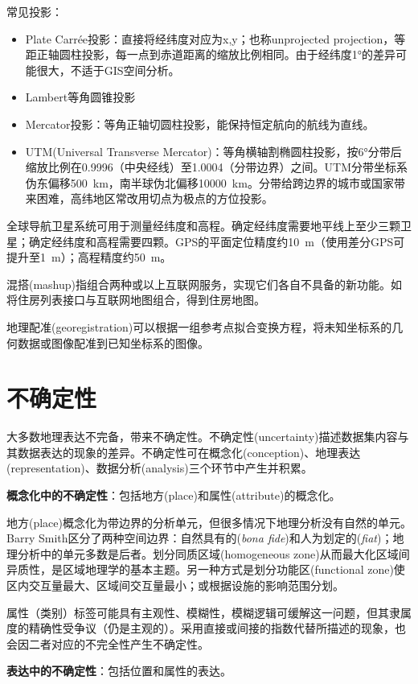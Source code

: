 \par 常见投影：
\begin{itemize}
    \item Plate Carr\'{e}e投影：直接将经纬度对应为x,y；也称unprojected projection，等距正轴圆柱投影，每一点到赤道距离的缩放比例相同。由于经纬度1°的差异可能很大，不适于GIS空间分析。
    \item Lambert等角圆锥投影
    \item Mercator投影：等角正轴切圆柱投影，能保持恒定航向的航线为直线。
    \item UTM(Universal Transverse Mercator)：等角横轴割椭圆柱投影，按6°分带后缩放比例在0.9996（中央经线）至1.0004（分带边界）之间。UTM分带坐标系伪东偏移\SI{500}{\kilo\metre}，南半球伪北偏移\SI{10000}{\kilo\metre}。分带给跨边界的城市或国家带来困难，高纬地区常改用切点为极点的方位投影。
\end{itemize}

\par 全球导航卫星系统可用于测量经纬度和高程。确定经纬度需要地平线上至少三颗卫星；确定经纬度和高程需要四颗。GPS的平面定位精度约\SI{10}{\metre}（使用差分GPS可提升至\SI{1}{\metre}）；高程精度约\SI{50}{\metre}。

\par 混搭(mashup)指组合两种或以上互联网服务，实现它们各自不具备的新功能。如将住房列表接口与互联网地图组合，得到住房地图。

\par 地理配准(georegistration)可以根据一组参考点拟合变换方程，将未知坐标系的几何数据或图像配准到已知坐标系的图像。

\section{不确定性}

大多数地理表达不完备，带来不确定性。不确定性(uncertainty)描述数据集内容与其数据表达的现象的差异。不确定性可在概念化(conception)、地理表达(representation)、数据分析(analysis)三个环节中产生并积累。

\textbf{概念化中的不确定性}：包括地方(place)和属性(attribute)的概念化。
\par 地方(place)概念化为带边界的分析单元，但很多情况下地理分析没有自然的单元。Barry Smith区分了两种空间边界：自然具有的(\emph{bona fide})和人为划定的(\emph{fiat})；地理分析中的单元多数是后者。划分同质区域(homogeneous zone)从而最大化区域间异质性，是区域地理学的基本主题。另一种方式是划分功能区(functional zone)使区内交互量最大、区域间交互量最小；或根据设施的影响范围分划。
\par 属性（类别）标签可能具有主观性、模糊性，模糊逻辑可缓解这一问题，但其隶属度的精确性受争议（仍是主观的）。采用直接或间接的指数代替所描述的现象，也会因二者对应的不完全性产生不确定性。

\textbf{表达中的不确定性}：包括位置和属性的表达。